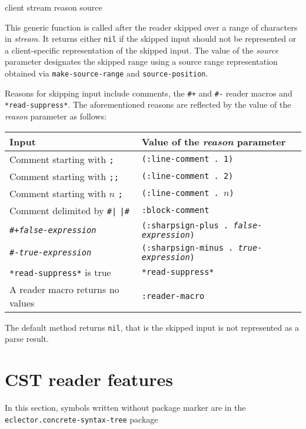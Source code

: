  {client stream reason source}

This generic function is called after the reader skipped over a range
of characters in \textit{stream}.  It returns either \texttt{nil} if
the skipped input should not be represented or a client-specific
representation of the skipped input.  The value of the \textit{source}
parameter designates the skipped range using a source range
representation obtained via \texttt{make-source-range} and
\texttt{source-position}.

Reasons for skipping input include comments, the \texttt{\#+} and
\texttt{\#-} reader macros and \texttt{*read-suppress*}.  The
aforementioned reasons are reflected by the value of the
\textit{reason} parameter as follows:

\begin{tabular}{ll}
  Input                                          & Value of the \textit{reason} parameter\\
  \hline
  Comment starting with \texttt{;}               & \texttt{(:line-comment~.~1)}\\
  Comment starting with \texttt{;;}              & \texttt{(:line-comment~.~2)}\\
  Comment starting with $n$ \texttt{;}           & \texttt{(:line-comment~.~$n$)}\\
  Comment delimited by \texttt{\#|} \texttt{|\#} & \texttt{:block-comment}\\
  \texttt{\#+\textit{false-expression}}          & \texttt{(:sharpsign-plus~.~\textit{false-expression})}\\
  \texttt{\#-\textit{true-expression}}           & \texttt{(:sharpsign-minus~.~\textit{true-expression})}\\
  \texttt{*read-suppress*} is true               & \texttt{*read-suppress*}\\
  A reader macro returns no values               & \texttt{:reader-macro}
\end{tabular}

The default method returns \texttt{nil}, that is the skipped input is
not represented as a parse result.

\section{CST reader features}
\label{sec:cst-reader-features}

In this section, symbols written without package marker are in the
\texttt{eclector.concrete-syntax-tree} package

